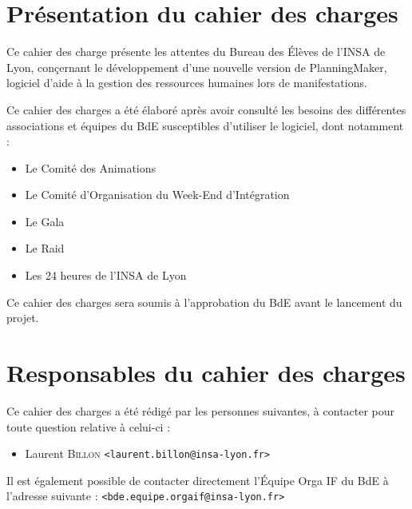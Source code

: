 \section{Présentation du cahier des charges}
Ce cahier des charge présente les attentes du Bureau des Élèves de l'INSA de Lyon, conçernant le développement d'une nouvelle version de PlanningMaker, logiciel
d'aide à la gestion des ressources humaines lors de manifestations.

Ce cahier des charges a été élaboré après avoir consulté les besoins des différentes associations et équipes du BdE susceptibles d'utiliser le logiciel, dont notamment : 
\begin{itemize}
 \item Le Comité des Animations
\item Le Comité d'Organisation du Week-End d'Intégration
\item Le Gala
\item Le Raid
\item Les 24 heures de l'INSA de Lyon
\end{itemize}

Ce cahier des charges sera soumis à l'approbation du BdE avant le lancement du projet.

\section{Responsables du cahier des charges}
Ce cahier des charges a été rédigé par les personnes suivantes, à contacter pour toute question relative à celui-ci : 
\begin{itemize}
 \item Laurent \textsc{Billon} \texttt{<laurent.billon@insa-lyon.fr>}
\end{itemize}

Il est également possible de contacter directement l'Équipe Orga IF du BdE à l'adresse suivante : \texttt{<bde.equipe.orgaif@insa-lyon.fr>}